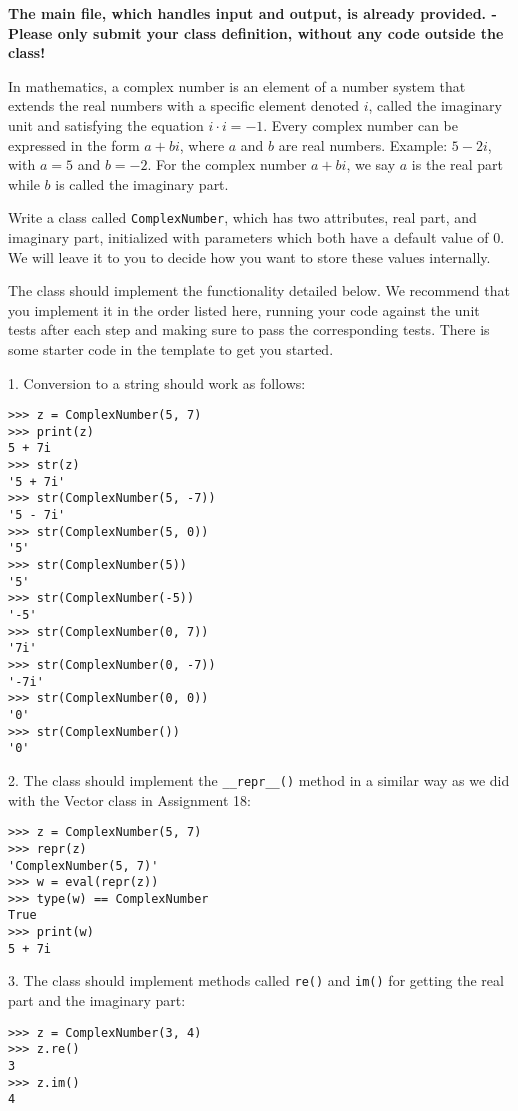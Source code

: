 

\textbf{The main file, which handles input and output, is already provided. -
Please only submit your class definition, without any code outside the class!}

In mathematics, a complex number is an element of a number system
that extends the real numbers with a specific element denoted $i$,
called the imaginary unit and satisfying the equation $i \cdot i = -1$.
Every complex number can be expressed in the form $a + bi$,
where $a$ and $b$ are real numbers.
Example: $5 - 2i$, with $a = 5$ and $b = -2$.
For the complex number $a + bi$,
we say $a$ is the real part
while $b$ is called the imaginary part.

Write a class called \texttt{ComplexNumber},
which has two attributes, real part, and imaginary part,
initialized with parameters which both have a default value of $0$.
We will leave it to you to decide how you want to store these values internally.

The class should implement the functionality detailed below.
We recommend that you implement it in the order listed here,
running your code against the unit tests after each step
and making sure to pass the corresponding tests.
There is some starter code in the template to get you started.

1. Conversion to a string should work as follows:
\begin{verbatim}
>>> z = ComplexNumber(5, 7)
>>> print(z)
5 + 7i
>>> str(z)
'5 + 7i'
>>> str(ComplexNumber(5, -7))
'5 - 7i'
>>> str(ComplexNumber(5, 0))
'5'
>>> str(ComplexNumber(5))
'5'
>>> str(ComplexNumber(-5))
'-5'
>>> str(ComplexNumber(0, 7))
'7i'
>>> str(ComplexNumber(0, -7))
'-7i'
>>> str(ComplexNumber(0, 0))
'0'
>>> str(ComplexNumber())
'0'
\end{verbatim}

2. The class should implement the \texttt{\_\_repr\_\_()} method
in a similar way as we did with the Vector class in Assignment 18:
\begin{verbatim}
>>> z = ComplexNumber(5, 7)
>>> repr(z)
'ComplexNumber(5, 7)'
>>> w = eval(repr(z))
>>> type(w) == ComplexNumber
True
>>> print(w)
5 + 7i
\end{verbatim}

3. The class should implement methods called \texttt{re()} and \texttt{im()}
for getting the real part and the imaginary part:
\begin{verbatim}
>>> z = ComplexNumber(3, 4)
>>> z.re()
3
>>> z.im()
4
\end{verbatim}

